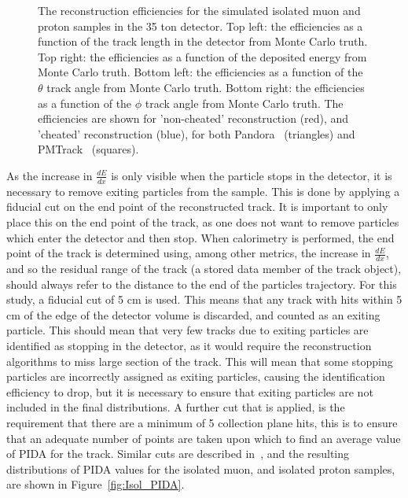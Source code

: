 \begin{figure}
  \caption[The reconstruction efficiencies for the simulated isolated muon and proton samples in the 35 ton detector.]
          {The reconstruction efficiencies for the simulated isolated muon and proton samples in the 35 ton detector. Top left: the efficiencies as a function of the track length in the detector from Monte Carlo truth. Top right: the efficiencies as a function of the deposited energy from Monte Carlo truth. Bottom left: the efficiencies as a function of the $\theta$ track angle from Monte Carlo truth. Bottom right: the efficiencies as a function of the $\phi$ track angle from Monte Carlo truth. The efficiencies are shown for 'non-cheated' reconstruction (red), and 'cheated' reconstruction (blue), for both Pandora~\citep{Pandora} (triangles) and PMTrack~\citep{PMTrack} (squares).}
   \label{fig:Isol_Effic}
\end{figure}

As the increase in $\frac{dE}{dx}$ is only visible when the particle stops in the detector, it is necessary to remove exiting particles from the sample. This is done by applying a fiducial cut on the end point of the reconstructed track. It is important to only place this on the end point of the track, as one does not want to remove particles which enter the detector and then stop. When calorimetry is performed, the end point of the track is determined using, among other metrics, the increase in $\frac{dE}{dx}$, and so the residual range of the track (a stored data member of the track object), should always refer to the distance to the end of the particles trajectory. For this study, a fiducial cut of 5 cm is used. This means that any track with hits within 5 cm of the edge of the detector volume is discarded, and counted as an exiting particle. This should mean that very few tracks due to exiting particles are identified as stopping in the detector, as it would require the reconstruction algorithms to miss large section of the track. This will mean that some stopping particles are incorrectly assigned as exiting particles, causing the identification efficiency to drop, but it is necessary to ensure that exiting particles are not included in the final distributions. A further cut that is applied, is the requirement that there are a minimum of 5 collection plane hits, this is to ensure that an adequate number of points are taken upon which to find an average value of PIDA for the track. Similar cuts are described in~\citep{PIDA_Paper}, and the resulting distributions of PIDA values for the isolated muon, and isolated proton samples, are shown in Figure~\ref{fig:Isol_PIDA}. \\

